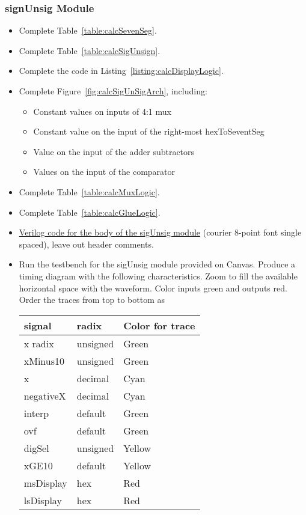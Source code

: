 \subsubsection{signUnsig Module}

\begin{itemize}
\item
  Complete Table~\ref{table:calcSevenSeg}.
\item
  Complete Table~\ref{table:calcSigUnsign}.
\item
  Complete the code in Listing~\ref{listing:calcDisplayLogic}.
\item
  Complete Figure~\ref{fig:calcSigUnSigArch}, including:

  \begin{itemize}
  \item
    Constant values on inputs of 4:1 mux
  \item
    Constant value on the input of the right-most hexToSeventSeg
  \item
    Value on the input of the adder subtractors
  \item
    Values on the input of the comparator
  \end{itemize}
\item
  Complete Table~\ref{table:calcMuxLogic}.
\item
  Complete Table~\ref{table:calcGlueLogic}.
\item
  \protect\hyperlink{sigUnsign_Verilog}{Verilog code for the body of the
  sigUnsig module} (courier 8-point font single spaced), leave out
  header comments.
\item
  Run the testbench for the sigUnsig module provided on Canvas. Produce
  a timing diagram with the following characteristics. Zoom to fill the
  available horizontal space with the waveform. Color inputs green and
  outputs red. Order the traces from top to bottom as

  \begin{tabular}{p{3cm}p{3cm}p{3cm}}
  signal			& radix				& Color for trace \\ \hline
    x radix 		&	unsigned 		& Green  \\
    xMinus10 		&	 unsigned 	& Green  \\
    x 				&  decimal 		& Cyan  \\
    negativeX 		&  decimal 		& Cyan  \\
    interp 			& default 			& Green  \\
    ovf 			& default 			& Green  \\
    digSel 			&  unsigned 		& Yellow  \\
    xGE10 		& default 			& Yellow  \\
    msDisplay 		&  hex 			& Red  \\
    lsDisplay 		&  hex 			& Red  \\
  \end{tabular}
\end{itemize}

